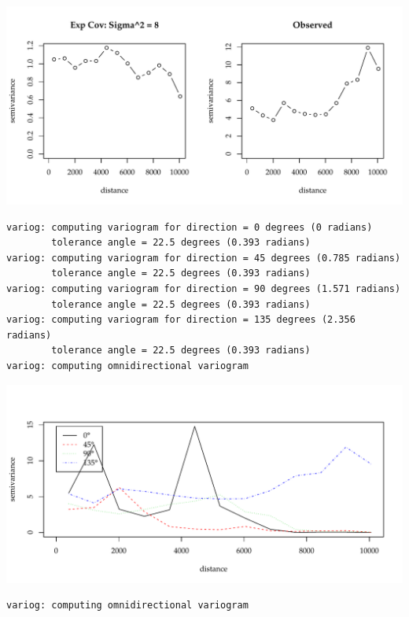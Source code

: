 \documentclass{article}\usepackage[]{graphicx}\usepackage[]{color}
\makeatletter
\def\maxwidth{ %
  \ifdim\Gin@nat@width>\linewidth
    \linewidth
  \else
    \Gin@nat@width
  \fi
}
\newenvironment{kframe}{%
 \def\at@end@of@kframe{}%
 \ifinner\ifhmode%
  \def\at@end@of@kframe{\end{minipage}}%
  \begin{minipage}{\columnwidth}%
 \fi\fi%
 \def\FrameCommand##1{\hskip\@totalleftmargin \hskip-\fboxsep
 \colorbox{shadecolor}{##1}\hskip-\fboxsep
     \hskip-\linewidth \hskip-\@totalleftmargin \hskip\columnwidth}%
 \MakeFramed {\advance\hsize-\width
   \@totalleftmargin\z@ \linewidth\hsize
   \@setminipage}}%
 {\par\unskip\endMakeFramed%
 \at@end@of@kframe}
\newenvironment{knitrout}{}{} %
\makeatother
\begin{document}
\begin{knitrout}
{\centering \includegraphics[width=\maxwidth]{figure/sims_se-11} 

}


\begin{kframe}\begin{verbatim}
variog: computing variogram for direction = 0 degrees (0 radians)
        tolerance angle = 22.5 degrees (0.393 radians)
variog: computing variogram for direction = 45 degrees (0.785 radians)
        tolerance angle = 22.5 degrees (0.393 radians)
variog: computing variogram for direction = 90 degrees (1.571 radians)
        tolerance angle = 22.5 degrees (0.393 radians)
variog: computing variogram for direction = 135 degrees (2.356 radians)
        tolerance angle = 22.5 degrees (0.393 radians)
variog: computing omnidirectional variogram
\end{verbatim}
\end{kframe}

{\centering \includegraphics[width=\maxwidth]{figure/sims_se-12} 

}


\begin{kframe}\begin{verbatim}
variog: computing omnidirectional variogram
\end{verbatim}
\end{kframe}


\end{knitrout}
\end{document}
